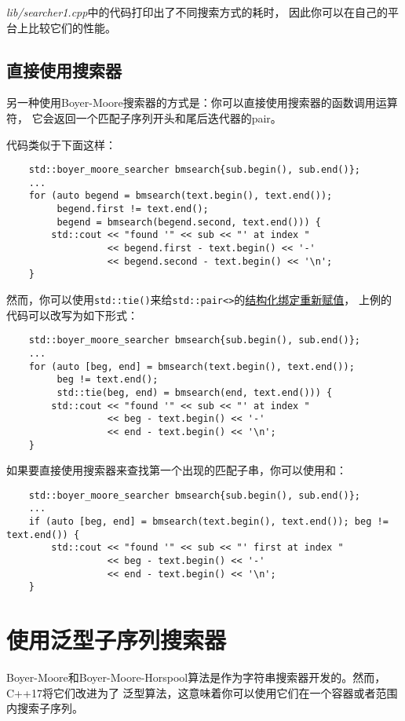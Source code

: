 \emph{lib/searcher1.cpp}中的代码打印出了不同搜索方式的耗时，
因此你可以在自己的平台上比较它们的性能。

\subsection{直接使用搜索器}\label{ch24.1.2}
另一种使用Boyer-Moore搜索器的方式是：你可以直接使用搜索器的函数调用运算符，
它会返回一个匹配子序列开头和尾后迭代器的pair。

代码类似于下面这样：
\begin{lstlisting}
    std::boyer_moore_searcher bmsearch{sub.begin(), sub.end()};
    ...
    for (auto begend = bmsearch(text.begin(), text.end());
         begend.first != text.end();
         begend = bmsearch(begend.second, text.end())) {
        std::cout << "found '" << sub << "' at index "
                  << begend.first - text.begin() << '-'
                  << begend.second - text.begin() << '\n';
    }
\end{lstlisting}
然而，你可以使用\texttt{std::tie()}来给\texttt{std::pair<>}的\hyperref[ch1.2.3.4]{结构化绑定重新赋值}，
上例的代码可以改写为如下形式：
\begin{lstlisting}
    std::boyer_moore_searcher bmsearch{sub.begin(), sub.end()};
    ...
    for (auto [beg, end] = bmsearch(text.begin(), text.end());
         beg != text.end();
         std::tie(beg, end) = bmsearch(end, text.end())) {
        std::cout << "found '" << sub << "' at index "
                  << beg - text.begin() << '-'
                  << end - text.begin() << '\n';
    }
\end{lstlisting}
如果要直接使用搜索器来查找第一个出现的匹配子串，你可以使用和：
\begin{lstlisting}
    std::boyer_moore_searcher bmsearch{sub.begin(), sub.end()};
    ...
    if (auto [beg, end] = bmsearch(text.begin(), text.end()); beg != text.end()) {
        std::cout << "found '" << sub << "' first at index "
                  << beg - text.begin() << '-'
                  << end - text.begin() << '\n';
    }
\end{lstlisting}


\section{使用泛型子序列搜索器}
Boyer-Moore和Boyer-Moore-Horspool算法是作为字符串搜索器开发的。然而，C++17将它们改进为了
泛型算法，这意味着你可以使用它们在一个容器或者范围内搜索子序列。

